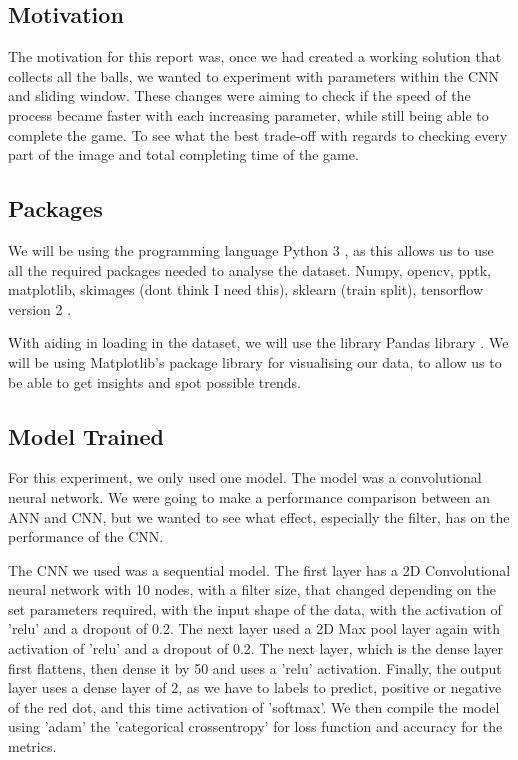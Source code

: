 \documentclass[a4paper,10pt]{article}
\begin{document}
\subsection{Motivation}

The motivation for this report was, once we had created a working solution that collects all the balls, we wanted to experiment with parameters within the CNN and sliding window. These changes were aiming to check if the speed of the process became faster with each increasing parameter, while still being able to complete the game. To see what the best trade-off with regards to checking every part of the image and total completing time of the game.

\subsection{Packages}


We will be using the programming language Python 3 \cite{Python}, as this allows us to use all the required packages needed to analyse the dataset. Numpy, opencv, pptk, matplotlib, skimages (dont think I need this), sklearn (train split), tensorflow version 2 \cite{tensorflow2015-whitepaper}.

With aiding in loading in the dataset, we will use the library Pandas library \cite{mckinney-proc-scipy-2010}. We will be using Matplotlib's \cite{hunter2007matplotlib} package library for visualising our data, to allow us to be able to get insights and spot possible trends.


\subsection{Model Trained}
For this experiment, we only used one model. The model was a convolutional neural network. We were going to make a performance comparison between an ANN and CNN, but we wanted to see what effect, especially the filter, has on the performance of the CNN. 

The CNN we used was a sequential model. The first layer has a 2D Convolutional neural network with 10 nodes, with a filter size, that changed depending on the set parameters required, with the input shape of the data, with the activation of 'relu' and a dropout of 0.2. The next layer used a 2D Max pool layer again with activation of 'relu' and a dropout of 0.2. The next layer, which is the dense layer first flattens, then dense it by 50 and uses a 'relu' activation. Finally, the output layer uses a dense layer of 2, as we have to labels to predict, positive or negative of the red dot, and this time activation of 'softmax'. We then compile the model using 'adam' the 'categorical crossentropy' for loss function and accuracy for the metrics.
\end{document}
